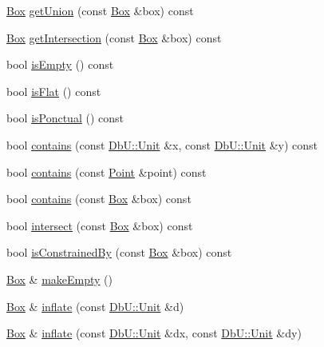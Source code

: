\begin{DoxyCompactItemize}
\hyperlink{classHurricane_1_1Box}{Box} \hyperlink{classHurricane_1_1Box_a2670058f109dfae32d284db249e533bc}{get\+Union} (const \hyperlink{classHurricane_1_1Box}{Box} \&box) const
\item 
\hyperlink{classHurricane_1_1Box}{Box} \hyperlink{classHurricane_1_1Box_a610f9c63bc5636ef304f4768215ffb12}{get\+Intersection} (const \hyperlink{classHurricane_1_1Box}{Box} \&box) const
\item 
bool \hyperlink{classHurricane_1_1Box_af8b269603b5c173891a484214ca50266}{is\+Empty} () const
\item 
bool \hyperlink{classHurricane_1_1Box_a0df4d580a3dc1eb23d839c0f53cdee8b}{is\+Flat} () const
\item 
bool \hyperlink{classHurricane_1_1Box_a3d073c5bc3d0ea1b4f21937e36be001f}{is\+Ponctual} () const
\item 
bool \hyperlink{classHurricane_1_1Box_ae18dd30ffbf0b75714ece480f21e2898}{contains} (const \hyperlink{group__DbUGroup_ga4fbfa3e8c89347af76c9628ea06c4146}{Db\+U\+::\+Unit} \&x, const \hyperlink{group__DbUGroup_ga4fbfa3e8c89347af76c9628ea06c4146}{Db\+U\+::\+Unit} \&y) const
\item 
bool \hyperlink{classHurricane_1_1Box_a19ad23904fbfe2afb3683affeb2cac7e}{contains} (const \hyperlink{classHurricane_1_1Point}{Point} \&point) const
\item 
bool \hyperlink{classHurricane_1_1Box_ac567c569f23643e58867afee80f6920a}{contains} (const \hyperlink{classHurricane_1_1Box}{Box} \&box) const
\item 
bool \hyperlink{classHurricane_1_1Box_ae76b57bf6399b29021813da8d3f306ec}{intersect} (const \hyperlink{classHurricane_1_1Box}{Box} \&box) const
\item 
bool \hyperlink{classHurricane_1_1Box_a70d832443d97cb40ec7cb4f0f959a977}{is\+Constrained\+By} (const \hyperlink{classHurricane_1_1Box}{Box} \&box) const
\item 
\hyperlink{classHurricane_1_1Box}{Box} \& \hyperlink{classHurricane_1_1Box_a0717b1b105f65f8284c9b4e36df3a766}{make\+Empty} ()
\item 
\hyperlink{classHurricane_1_1Box}{Box} \& \hyperlink{classHurricane_1_1Box_a90207e7ca8044a6afc72674cc6ae366e}{inflate} (const \hyperlink{group__DbUGroup_ga4fbfa3e8c89347af76c9628ea06c4146}{Db\+U\+::\+Unit} \&d)
\item 
\hyperlink{classHurricane_1_1Box}{Box} \& \hyperlink{classHurricane_1_1Box_a6b97ea9d54fbf4dae52459073cdf4b5f}{inflate} (const \hyperlink{group__DbUGroup_ga4fbfa3e8c89347af76c9628ea06c4146}{Db\+U\+::\+Unit} \&dx, const \hyperlink{group__DbUGroup_ga4fbfa3e8c89347af76c9628ea06c4146}{Db\+U\+::\+Unit} \&dy)

\end{DoxyCompactItemize}
